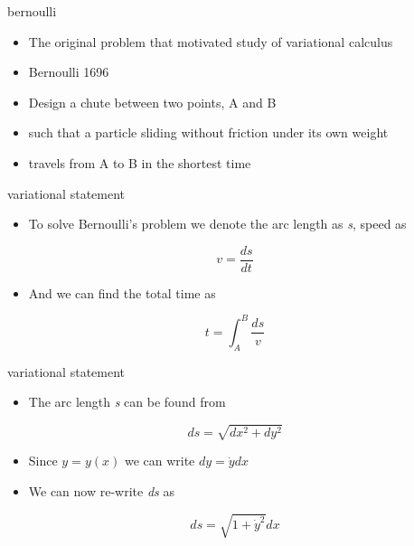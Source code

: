 \documentclass[12pt,handout]{beamer}
\providecommand{\tightlist}{%
  \setlength{\itemsep}{0pt}\setlength{\parskip}{0pt}}
\providecommand{\tightlist}{%
\setlength{\itemsep}{0pt}\setlength{\parskip}{0pt}}
\begin{document}
\begin{frame}{bernoulli}
\protect\hypertarget{bernoulli}{}
\begin{itemize}
\tightlist
\item
  The original problem that motivated study of variational calculus
\item
  Bernoulli 1696
\item
  Design a chute between two points, A and B
\item
  such that a particle sliding without friction under its own weight
\item
  travels from A to B in the shortest time
\end{itemize}
\end{frame}

\begin{frame}{variational statement}
\protect\hypertarget{variational-statement}{}
\begin{itemize}
\tightlist
\item
  To solve Bernoulli's problem we denote the arc length as \emph{s},
  speed as
\end{itemize}

\[v = \frac{ds}{dt}\]

\begin{itemize}
\tightlist
\item
  And we can find the total time as
\end{itemize}

\[t = \int_A^B \frac{ds}{v}\]
\end{frame}

\begin{frame}{variational statement}
\protect\hypertarget{variational-statement-1}{}
\begin{itemize}
\tightlist
\item
  The arc length \emph{s} can be found from
\end{itemize}

\[ds = \sqrt{dx^2 + dy^2}\]

\begin{itemize}
\tightlist
\item
  Since \(y=y(x)\) we can write \(dy = \dot{y} dx\)
\item
  We can now re-write \emph{ds} as
\end{itemize}

\[ds = \sqrt{1 + \dot{y}^2}dx\]
\end{frame}
\end{document}
